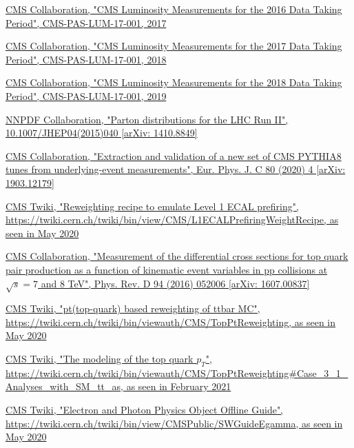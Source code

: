 \documentclass[a4paper, 10pt, openright]{report}
\begin{document}
\begin{thebibliography}{1}
\href{https://cds.cern.ch/record/2257069}{CMS Collaboration,
"CMS Luminosity Measurements for the 2016 Data Taking Period",
CMS-PAS-LUM-17-001, 2017}

\href{http://inspirehep.net/record/1677076}{CMS Collaboration,
"CMS Luminosity Measurements for the 2017 Data Taking Period",
CMS-PAS-LUM-17-001, 2018}

\href{http://inspirehep.net/record/1736713/}{CMS Collaboration,
"CMS Luminosity Measurements for the 2018 Data Taking Period",
CMS-PAS-LUM-17-001, 2019}

\href{https://arxiv.org/abs/1410.8849}{NNPDF Collaboration,
"Parton distributions for the LHC Run II", 10.1007/JHEP04(2015)040 [arXiv: 1410.8849]}

\href{https://arxiv.org/abs/1903.12179}{\ac{CMS} Collaboration,
"Extraction and validation of a new set of CMS PYTHIA8 tunes from underlying-event measurements", Eur. Phys. J. C 80 (2020) 4 [arXiv: 1903.12179]}

\href{https://twiki.cern.ch/twiki/bin/view/CMS/L1ECALPrefiringWeightRecipe}{\ac{CMS} Twiki,
"Reweighting recipe to emulate Level 1 ECAL prefiring", \url{https://twiki.cern.ch/twiki/bin/view/CMS/L1ECALPrefiringWeightRecipe}, as seen in May 2020}

\href{https://arxiv.org/abs/1607.00837}{CMS Collaboration,
"Measurement of the differential cross sections for top quark pair production as a function of kinematic event variables in pp collisions at $\sqrt{s} = 7$ and 8 TeV",
Phys. Rev. D 94 (2016) 052006 [arXiv: 1607.00837]}

\href{https://twiki.cern.ch/twiki/bin/viewauth/CMS/TopPtReweighting}{\ac{CMS} Twiki,
"pt(top-quark) based reweighting of ttbar MC", \url{https://twiki.cern.ch/twiki/bin/viewauth/CMS/TopPtReweighting}, as seen in May 2020}

\href{https://twiki.cern.ch/twiki/bin/viewauth/CMS/TopPtReweighting\#Case\_3\_1\_Analyses\_with\_SM\_tt\_as}{\ac{CMS} Twiki,
"The modeling of the top quark $p_T$", \url{https://twiki.cern.ch/twiki/bin/viewauth/CMS/TopPtReweighting\#Case\_3\_1\_Analyses\_with\_SM\_tt\_as}, as seen in February 2021}

\href{https://twiki.cern.ch/twiki/bin/view/CMSPublic/SWGuideEgamma}{\ac{CMS} Twiki,
"Electron and Photon Physics Object Offline Guide", \url{https://twiki.cern.ch/twiki/bin/view/CMSPublic/SWGuideEgamma}, as seen in May 2020}


\end{thebibliography}
\end{document}
